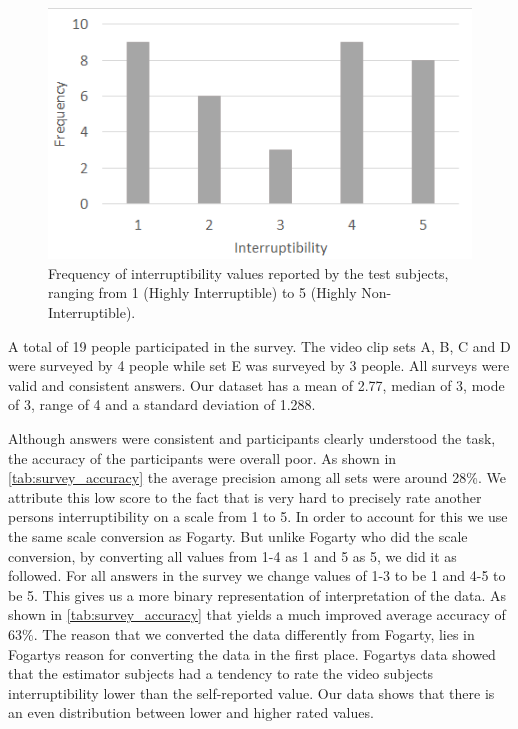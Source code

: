 \documentclass{sigchi}
\begin{document}
\begin{figure}
  \centering
  \includegraphics[width=\columnwidth]{figures/Interruptibility_values_videotest.png}
  \caption{Frequency of interruptibility values reported by the test subjects, ranging from 1 (Highly Interruptible) to 5 (Highly Non-Interruptible).}
  \label{fig:interruptibilityFrequency}
\end{figure}

A total of 19 people participated in the survey.
The video clip sets A, B, C and D were surveyed by 4 people while set E was surveyed by 3 people.
All surveys were valid and consistent answers.
Our dataset has a mean of 2.77, median of 3, mode of 3, range of 4 and a standard deviation of 1.288.

Although answers were consistent and participants clearly understood the task, the accuracy of the participants were overall poor.
As shown in \autoref{tab:survey_accuracy} the average precision among all sets were around 28\%.
We attribute this low score to the fact that is very hard to precisely rate another persons interruptibility on a scale from 1 to 5.
In order to account for this we use the same scale conversion as Fogarty\cite{fogarty2005predicting}.
But unlike Fogarty who did the scale conversion, by converting all values from 1-4 as 1 and 5 as 5, we did it as followed.
For all answers in the survey we change values of 1-3 to be 1 and 4-5 to be 5.
This gives us a more binary representation of interpretation of the data.
As shown in \autoref{tab:survey_accuracy} that yields a much improved average accuracy of 63\%.
The reason that we converted the data differently from Fogarty, lies in Fogartys reason for converting the data in the first place.
Fogartys data showed that the estimator subjects had a tendency to rate the video subjects interruptibility lower than the self-reported value.
Our data shows that there is an even distribution between lower and higher rated values.
\end{document}
